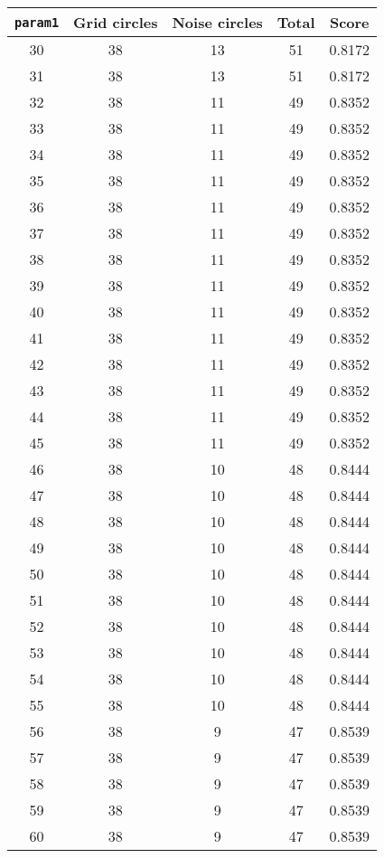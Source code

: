 \documentclass[letterpaper, 12pt]{article}
\begin{document}
\begin{longtable}{|c|c|c|c|c|}
\hline
\textbf{\texttt{param1}} & \textbf{Grid circles} & \textbf{Noise circles} & \textbf{Total} & \textbf{Score} \\
\hline
30 & 38 & 13 & 51 & 0.8172 \\
\hline
31 & 38 & 13 & 51 & 0.8172 \\
\hline
32 & 38 & 11 & 49 & 0.8352 \\
\hline
33 & 38 & 11 & 49 & 0.8352 \\
\hline
34 & 38 & 11 & 49 & 0.8352 \\
\hline
35 & 38 & 11 & 49 & 0.8352 \\
\hline
36 & 38 & 11 & 49 & 0.8352 \\
\hline
37 & 38 & 11 & 49 & 0.8352 \\
\hline
38 & 38 & 11 & 49 & 0.8352 \\
\hline
39 & 38 & 11 & 49 & 0.8352 \\
\hline
40 & 38 & 11 & 49 & 0.8352 \\
\hline
41 & 38 & 11 & 49 & 0.8352 \\
\hline
42 & 38 & 11 & 49 & 0.8352 \\
\hline
43 & 38 & 11 & 49 & 0.8352 \\
\hline
44 & 38 & 11 & 49 & 0.8352 \\
\hline
45 & 38 & 11 & 49 & 0.8352 \\
\hline
46 & 38 & 10 & 48 & 0.8444 \\
\hline
47 & 38 & 10 & 48 & 0.8444 \\
\hline
48 & 38 & 10 & 48 & 0.8444 \\
\hline
49 & 38 & 10 & 48 & 0.8444 \\
\hline
50 & 38 & 10 & 48 & 0.8444 \\
\hline
51 & 38 & 10 & 48 & 0.8444 \\
\hline
52 & 38 & 10 & 48 & 0.8444 \\
\hline
53 & 38 & 10 & 48 & 0.8444 \\
\hline
54 & 38 & 10 & 48 & 0.8444 \\
\hline
55 & 38 & 10 & 48 & 0.8444 \\
\hline
56 & 38 & 9 & 47 & 0.8539 \\
\hline
57 & 38 & 9 & 47 & 0.8539 \\
\hline
58 & 38 & 9 & 47 & 0.8539 \\
\hline
59 & 38 & 9 & 47 & 0.8539 \\
\hline
60 & 38 & 9 & 47 & 0.8539 \\

\end{longtable}
\end{document}
